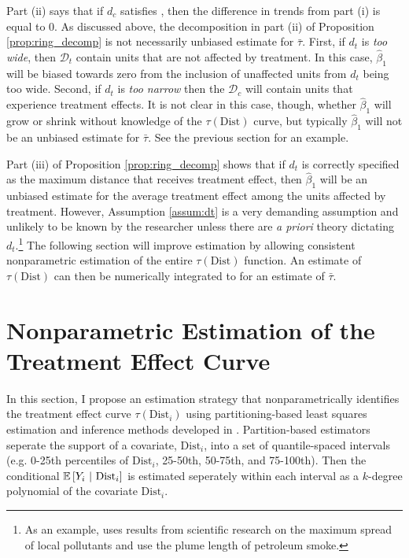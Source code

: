 \documentclass[12pt]{article}
\newcommand{\dist}{\text{Dist}}
\begin{document}
Part (ii) says that if $d_c$ satisfies , then the difference in trends from part (i) is equal to 0. As discussed above, the decomposition in part (ii) of Proposition \ref{prop:ring_decomp} is not necessarily unbiased estimate for $\bar{\tau}$. First, if $d_t$ is \emph{too wide}, then $\mathcal{D}_t$ contain units that are not affected by treatment. In this case, $\hat{\beta}_1$ will be biased towards zero from the inclusion of unaffected units from $d_t$ being too wide. Second, if $d_t$ is \emph{too narrow} then the $\mathcal{D}_c$ will contain units that experience treatment effects. It is not clear in this case, though, whether $\hat{\beta}_1$ will grow or shrink without knowledge of the $\tau(\dist)$ curve, but typically $\hat{\beta}_1$ will not be an unbiased estimate for $\bar{\tau}$. See the previous section for an example.  

Part (iii) of Proposition \ref{prop:ring_decomp} shows that if $d_t$ is correctly specified as the maximum distance that receives treatment effect, then $\hat{\beta}_1$ will be an unbiased estimate for the average treatment effect among the units affected by treatment. However, Assumption \ref{assum:dt} is a very demanding assumption and unlikely to be known by the researcher unless there are \emph{a priori} theory dictating $d_t$.\footnote{As an example, \citet{Currie_Davis_Greenstone_Walker_2015} uses results from scientific research on the maximum spread of local pollutants and \citet{Marcus_2021} use the plume length of petroleum smoke.} The following section will improve estimation by allowing consistent nonparametric estimation of the entire $\tau(\dist)$ function. An estimate of $\tau(\dist)$ can then be numerically integrated to for an estimate of $\bar{\tau}$.



\section{Nonparametric Estimation of the Treatment Effect Curve}\label{sec:lspartition}

In this section, I propose an estimation strategy that nonparametrically identifies the treatment effect curve $\tau(\dist_i)$ using partitioning-based least squares estimation and inference methods developed in \citet{Cattaneo_Crump_Farrell_Feng_2019, Cattaneo_Farrell_Feng_2019}. Partition-based estimators seperate the support of a covariate, $\dist_i$, into a set of quantile-spaced intervals (e.g. 0-25th percentiles of $\dist_i$, 25-50th, 50-75th, and 75-100th). Then the conditional $\condexpec{Y_i}{\dist_i}$ is estimated seperately within each interval as a $k$-degree polynomial of the covariate $\dist_i$.
\end{document}
